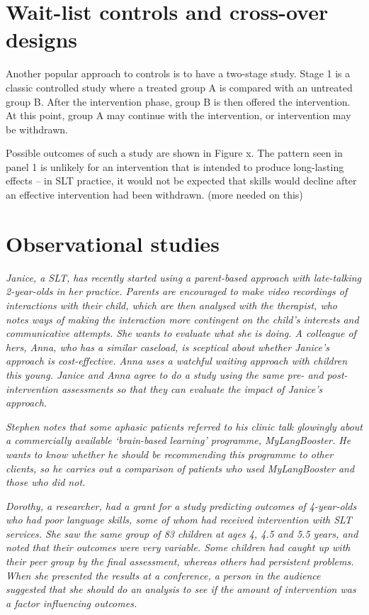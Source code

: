 \documentclass[]{book}
\begin{document}
\hypertarget{wait-list-controls-and-cross-over-designs}{%
\chapter{Wait-list controls and cross-over designs}\label{wait-list-controls-and-cross-over-designs}}

Another popular approach to controls is to have a two-stage study. Stage 1 is a classic controlled study where a treated group A is compared with an untreated group B. After the intervention phase, group B is then offered the intervention. At this point, group A may continue with the intervention, or intervention may be withdrawn.

Possible outcomes of such a study are shown in Figure x. The pattern seen in panel 1 is unlikely for an intervention that is intended to produce long-lasting effects -- in SLT practice, it would not be expected that skills would decline after an effective intervention had been withdrawn.
(more needed on this)
 

\hypertarget{observational-studies}{%
\chapter{Observational studies}\label{observational-studies}}

\emph{Janice, a SLT, has recently started using a parent-based approach with late-talking 2-year-olds in her practice. Parents are encouraged to make video recordings of interactions with their child, which are then analysed with the therapist, who notes ways of making the interaction more contingent on the child's interests and communicative attempts. She wants to evaluate what she is doing. A colleague of hers, Anna, who has a similar caseload, is sceptical about whether Janice's approach is cost-effective. Anna uses a watchful waiting approach with children this young. Janice and Anna agree to do a study using the same pre- and post-intervention assessments so that they can evaluate the impact of Janice's approach.}

\emph{Stephen notes that some aphasic patients referred to his clinic talk glowingly about a commercially available `brain-based learning' programme, MyLangBooster. He wants to know whether he should be recommending this programme to other clients, so he carries out a comparison of patients who used MyLangBooster and those who did not.}

\emph{Dorothy, a researcher, had a grant for a study predicting outcomes of 4-year-olds who had poor language skills, some of whom had received intervention with SLT services. She saw the same group of 83 children at ages 4, 4.5 and 5.5 years, and noted that their outcomes were very variable. Some children had caught up with their peer group by the final assessment, whereas others had persistent problems. When she presented the results at a conference, a person in the audience suggested that she should do an analysis to see if the amount of intervention was a factor influencing outcomes.}
\end{document}
